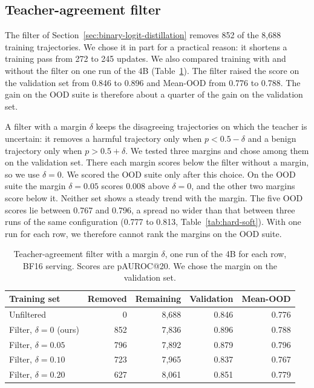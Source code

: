 \subsection{Teacher-agreement filter}
\label{app:ablation-filter}

The filter of Section~\ref{sec:binary-logit-distillation} removes 852 of the 8,688 training trajectories.
We chose it in part for a practical reason: it shortens a training pass from 272 to 245 updates.
We also compared training with and without the filter on one run of the 4B (Table~\ref{tab:filter}).
The filter raised the score on the validation set from 0.846 to 0.896 and Mean-OOD from 0.776 to 0.788.
The gain on the OOD suite is therefore about a quarter of the gain on the validation set.

A filter with a margin $\delta$ keeps the disagreeing trajectories on which the teacher is uncertain: it removes a harmful trajectory only when $p < 0.5 - \delta$ and a benign trajectory only when $p > 0.5 + \delta$.
We tested three margins and chose among them on the validation set.
There each margin scores below the filter without a margin, so we use $\delta = 0$.
We scored the OOD suite only after this choice.
On the OOD suite the margin $\delta = 0.05$ scores 0.008 above $\delta = 0$, and the other two margins score below it.
Neither set shows a steady trend with the margin.
The five OOD scores lie between 0.767 and 0.796, a spread no wider than that between three runs of the same configuration (0.777 to 0.813, Table~\ref{tab:hard-soft}).
With one run for each row, we therefore cannot rank the margins on the OOD suite.

\begin{table}[h]
\caption{Teacher-agreement filter with a margin $\delta$, one run of the 4B for each row, BF16 serving. Scores are pAUROC@20. We chose the margin on the validation set.}
\label{tab:filter}
\centering
\small
\begin{tabular}{@{}lrrrr@{}}
\toprule
Training set & Removed & Remaining & Validation & Mean-OOD \\
\midrule
Unfiltered & 0 & 8,688 & 0.846 & 0.776 \\
Filter, $\delta = 0$ (ours) & 852 & 7,836 & 0.896 & 0.788 \\
Filter, $\delta = 0.05$ & 796 & 7,892 & 0.879 & 0.796 \\
Filter, $\delta = 0.10$ & 723 & 7,965 & 0.837 & 0.767 \\
Filter, $\delta = 0.20$ & 627 & 8,061 & 0.851 & 0.779 \\
\bottomrule
\end{tabular}
\end{table}

